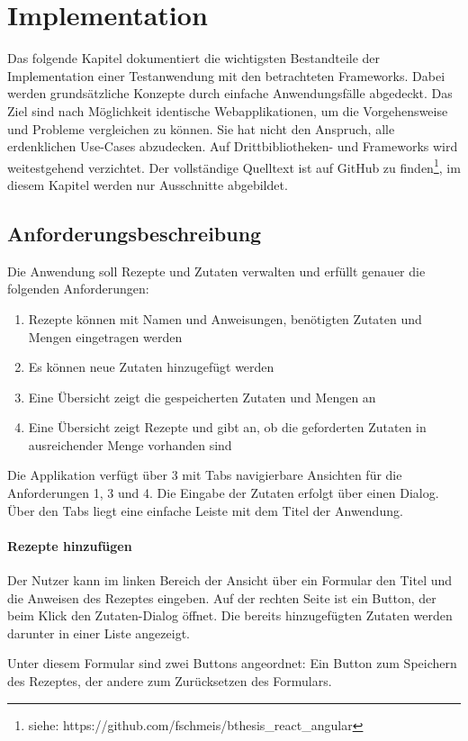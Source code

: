 \chapter{Implementation}\label{implementation}
Das folgende Kapitel dokumentiert die wichtigsten Bestandteile der Implementation einer Testanwendung mit den betrachteten Frameworks. Dabei werden grundsätzliche Konzepte durch einfache Anwendungsfälle abgedeckt. Das Ziel sind nach Möglichkeit identische Webapplikationen, um die Vorgehensweise und Probleme vergleichen zu können. Sie hat nicht den Anspruch, alle erdenklichen Use-Cases abzudecken. Auf Drittbibliotheken- und Frameworks wird weitestgehend verzichtet. 
Der vollständige Quelltext ist auf GitHub zu finden\footnote{siehe: https://github.com/fschmeis/bthesis\_react\_angular}, im diesem Kapitel werden nur Ausschnitte abgebildet.

\section{Anforderungsbeschreibung}
Die Anwendung soll Rezepte und Zutaten verwalten und erfüllt genauer die folgenden Anforderungen:
\begin{enumerate}
  \item Rezepte können mit Namen und Anweisungen, benötigten Zutaten und Mengen eingetragen werden
  \item Es können neue Zutaten hinzugefügt werden
  \item Eine Übersicht zeigt die gespeicherten Zutaten und Mengen an
  \item Eine Übersicht zeigt Rezepte und gibt an, ob die geforderten Zutaten in ausreichender Menge vorhanden sind
\end{enumerate}

Die Applikation verfügt über 3 mit Tabs navigierbare Ansichten für die Anforderungen 1, 3 und 4. Die Eingabe der Zutaten erfolgt über einen Dialog. Über den Tabs liegt eine einfache Leiste mit dem Titel der Anwendung.

\subsubsection{Rezepte hinzufügen}
Der Nutzer kann im linken Bereich der Ansicht über ein Formular den Titel und die Anweisen des Rezeptes eingeben. Auf der rechten Seite ist ein Button, der beim Klick den Zutaten-Dialog öffnet. Die bereits hinzugefügten Zutaten werden darunter in einer Liste angezeigt.

Unter diesem Formular sind zwei Buttons angeordnet: Ein Button zum Speichern des Rezeptes, der andere zum Zurücksetzen des Formulars.

